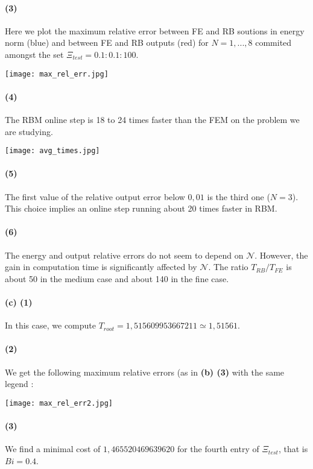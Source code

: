 \documentclass[a4paper]{article}
\newcounter{c}
\newcounter{d}
\newcounter{r}
\newcounter{e}
\begin{document}
\paragraph{(3)} Here we plot the maximum relative error between FE and RB soutions in energy norm (blue) and between FE and RB outputs (red) for $N=1,...,8$ commited amongst the set $\Xi_{test}=0.1:0.1:100$.
\begin{center}
\texttt{[image: max\_rel\_err.jpg]}
\end{center}


\paragraph{(4)} The RBM online step is 18 to 24 times faster than the FEM on the problem we are studying.

\begin{center}
\texttt{[image: avg\_times.jpg]}
\end{center}


\paragraph{(5)} The first value of the relative output error below $0,01$ is the third one ($N=3$). This choice implies an online step running about 20 times faster in RBM.


\paragraph{(6)}  The energy and output relative errors do not seem to depend on $\mathcal N$. However, the gain in computation time is significantly affected  by $\mathcal N$. The ratio $T_{RB}/T_{FE}$ is about 50 in the medium case and about 140 in the fine case.

\paragraph{(c) (1)} In this case, we compute $T_{root}=   1,515609953667211\simeq 1,51561$.

\paragraph{(2)} We get the following maximum relative errors (as in \textbf{(b) (3)} with the same legend :

\begin{center}
\texttt{[image: max\_rel\_err2.jpg]}
\end{center}

\paragraph{(3)} We find a minimal cost of $   1,465520469639620$ for the fourth entry of $\Xi_{test}$, that is $Bi=0.4$.
\end{document}
